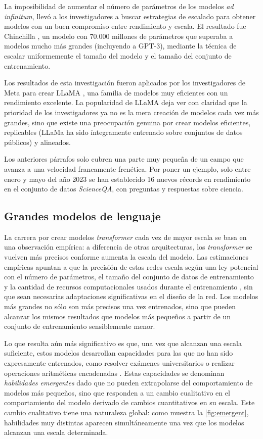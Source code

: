 La imposibilidad de aumentar el número de parámetros de los modelos \textit{ad infinitum}, llevó a los investigadores a buscar estrategias de escalado para obtener modelos con un buen compromiso entre rendimiento y escala. El resultado fue Chinchilla \cite{hoffmann2022training}, un modelo con 70.000 millones de parámetros que superaba a modelos mucho más grandes (incluyendo a GPT-3), mediante la técnica de escalar uniformemente el tamaño del modelo y el tamaño del conjunto de entrenamiento. 

Los resultados de esta investigación fueron aplicados por los investigadores de Meta para crear LLaMA \cite{touvron2023llama}, una familia de modelos muy eficientes con un rendimiento excelente. La popularidad de LLaMA deja ver con claridad que la prioridad de los investigadores ya no es la mera creación de modelos cada vez más grandes, sino que existe una preocupación genuina por crear modelos eficientes, replicables (LLaMa ha sido íntegramente entrenado sobre conjuntos de datos públicos) y alineados.

Los anteriores párrafos solo cubren una parte muy pequeña de un campo que avanza a una velocidad francamente frenética. Por poner un ejemplo, solo entre enero y mayo del año 2023 se han establecido 16 nuevos récords en rendimiento en el conjunto de datos \textit{ScienceQA}, con preguntas y respuestas sobre ciencia.

\subsection{Grandes modelos de lenguaje}
La carrera por crear modelos \textit{transformer} cada vez de mayor escala se basa en una observación empírica: a diferencia de otras arquitecturas, los \textit{transformer} se vuelven más precisos conforme aumenta la escala del modelo. Las estimaciones empíricas apuntan a que la precisión de estas redes escala según una ley potencial con el número de parámetros, el tamaño del conjunto de datos de entrenamiento y la cantidad de recursos computacionales usados durante el entrenamiento \cite{kaplan2020scaling}, sin que sean necesarias adaptaciones significativas en el diseño de la red. Los modelos más grandes no sólo son más precisos una vez entrenados, sino que pueden alcanzar los mismos resultados que modelos más pequeños a partir de un conjunto de entrenamiento sensiblemente menor.

Lo que resulta aún más significativo es que, una vez que alcanzan una escala suficiente, estos modelos desarrollan capacidades para las que no han sido expresamente entrenados, como resolver exámenes universitarios o realizar operaciones aritméticas encadenadas \cite{wei2022emergent}. Estas capacidades se denominan \textit{habilidades emergentes} dado que no pueden extrapolarse del comportamiento de modelos más pequeños, sino que responden a un cambio cualitativo en el comportamiento del modelo derivado de cambios cuantitativos en su escala. Este cambio cualitativo tiene una naturaleza global: como muestra la \cref{fig:emergent}, habilidades muy distintas aparecen simultáneamente una vez que los modelos alcanzan una escala determinada.

